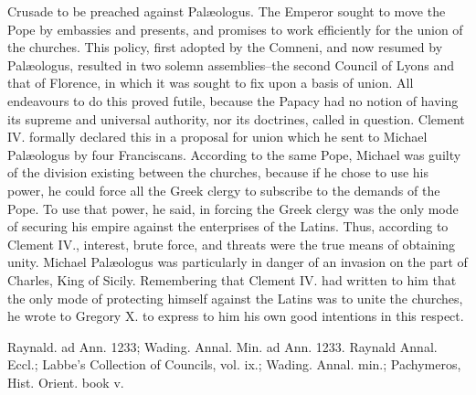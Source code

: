 Crusade to be preached against Palæologus. The Emperor sought to move the Pope by embassies and presents, and promises to work efficiently for the union of the churches. This policy, first adopted by the Comneni, and now resumed by Palæologus, resulted in two solemn assemblies--the second Council of Lyons and that of Florence, in which it was sought to fix upon a basis of union. All endeavours to do this proved futile, because the Papacy had no notion of having its supreme and universal authority, nor its doctrines, called in question. Clement IV. formally declared this in a proposal for union which he sent to Michael Palæologus by four Franciscans. According to the same Pope, Michael was guilty of the division existing between the churches, because if he chose to use his power, he could force all the Greek clergy to subscribe to the demands of the Pope. To use that power, he said, in forcing the Greek clergy was the only mode of securing his empire against the enterprises of the Latins. Thus, according to Clement IV., interest, brute force, and threats were the true means of obtaining unity. Michael Palæologus was particularly in danger of an invasion on the part of Charles, King of Sicily. Remembering that Clement IV. had written to him that the only mode of protecting himself against the Latins was to unite the churches, he wrote to Gregory X. to express to him his own good intentions in this respect.

Raynald. ad Ann. 1233; Wading. Annal. Min. ad Ann. 1233. Raynald Annal. Eccl.; Labbe’s Collection of Councils, vol. ix.; Wading. Annal. min.; Pachymeros, Hist. Orient. book v.

